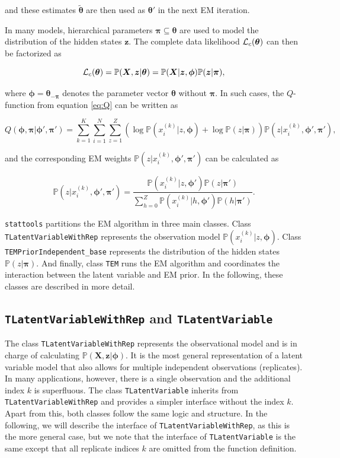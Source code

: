 \documentclass[a4paper,11pt]{article}
\def\X{\boldsymbol{X}}
\def\z{\boldsymbol{z}}
\def\bpi{\boldsymbol{\pi}}
\def\bphi{\boldsymbol{\phi}}
\def\btheta{\boldsymbol{\theta}}
\def\L{{\cal L}}
\def\p{\mathbb{P}}
\def\stattools{\texttt{stattools}}
\newcommand{\class}[1]{\texttt{#1}}
\begin{document}
and these estimates $\tilde{\btheta}$ are then used as $\btheta'$ in the next EM iteration.

In many models, hierarchical parameters $\bpi \subseteq \btheta$ are used to model the distribution of the hidden states $\z$. The complete data likelihood $\L_c(\btheta)$ can then be factorized as

$$
\L_c(\btheta) = \p(\X, \z | \btheta) = \p(\X | \z, \bphi) \p(\z | \bpi),
$$


where $\bphi = \btheta_{-\bpi}$ denotes the parameter vector $\btheta$ without $\bpi$. In such cases, the $Q$-function from equation \eqref{eq:Q} can be written as

\begin{equation*}
 Q(\bphi, \bpi | \bphi', \bpi') = \sum_{k=1}^K \sum_{i=1}^N \sum_{z=1}^Z \left( \log \p(x_i^{(k)} | z, \bphi) + \log \p(z | \bpi) \right)  \p(z | x_i^{(k)}, \bphi', \bpi'),
\end{equation*}

and the corresponding EM weights $\p(z | x_i^{(k)}, \bphi', \bpi')$ can be calculated as

\begin{equation}\label{eq:EM_weights_with_prior}
\p(z | x_i^{(k)}, \bphi', \bpi') = \frac{\p(x_i^{(k)} | z, \bphi') \p(z | \bpi') }{\sum_{h=0}^Z \p(x_i^{(k)} | h, \bphi') \p(h | \bpi')}.
\end{equation}

\stattools{} partitions the EM algorithm in three main classes. Class \class{TLatentVariableWithRep} represents the observation model $\p(x_i^{(k)} | z, \bphi)$. Class \class{TEMPriorIndependent\_base} represents the distribution of the hidden states $\p(z | \bpi)$. And finally, class \class{TEM} runs the EM algorithm and coordinates the interaction between the latent variable and EM prior. In the following, these classes are described in more detail.

\subsection{\class{TLatentVariableWithRep} and \class{TLatentVariable}}\label{section:TLatentVariableWithRep}

The class \class{TLatentVariableWithRep} represents the observational model and is in charge of calculating $\p(\X, \z | \bphi)$. It is the most general representation of a latent variable model that also allows for multiple independent observations (replicates). In many applications, however, there is a single observation and the additional index $k$ is superfluous. The class \class{TLatentVariable} inherits from \class{TLatentVariableWithRep} and provides a simpler interface without the index $k$. Apart from this, both classes follow the same logic and structure. In the following, we will describe the interface of \class{TLatentVariableWithRep}, as this is the more general case, but we note that the interface of \class{TLatentVariable} is the same except that all replicate indices $k$ are omitted from the function definition.
\end{document}
